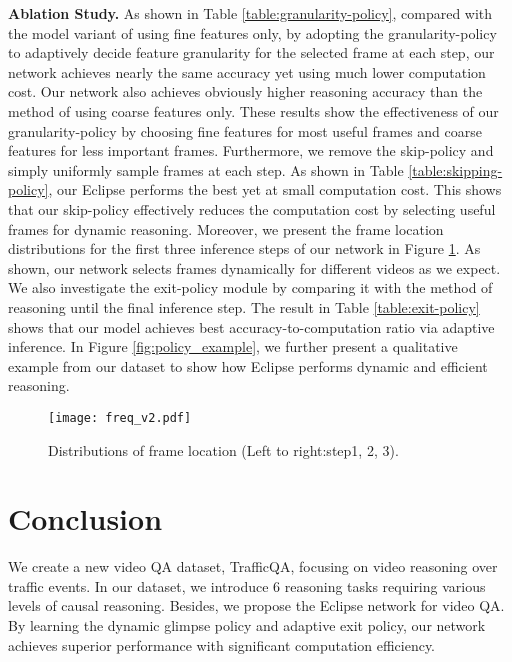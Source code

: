 \documentclass[final]{cvpr}
\begin{document}
{\bf Ablation Study.} As shown in Table \ref{table:granularity-policy}, compared with the model variant of using fine features only, by adopting the granularity-policy to adaptively decide feature granularity for the selected frame at each step, our network achieves nearly the same accuracy yet using much lower computation cost. 
Our network also achieves obviously higher reasoning accuracy than the method of using coarse features only. These results show the effectiveness of our granularity-policy by choosing fine features for most useful frames and coarse features for less important frames. 
Furthermore, we remove the skip-policy and simply uniformly sample frames at each step. 
As shown in Table \ref{table:skipping-policy}, our Eclipse performs the best yet at small computation cost. 
This shows that our skip-policy effectively reduces the computation cost by selecting useful frames for dynamic reasoning.
Moreover, we present the frame location distributions for the first three inference steps of our network in Figure \ref{fig:Freq}. 
As shown, our network selects frames dynamically for different videos as we expect. 
We also investigate the exit-policy module by comparing it with the method of reasoning until the final inference step. The result in Table \ref{table:exit-policy} shows that our model achieves best accuracy-to-computation ratio via adaptive inference. In Figure \ref{fig:policy_example}, we further present a qualitative example from our dataset to show how Eclipse performs dynamic and efficient reasoning. 


\begin{figure}[htbp]
\vspace{-0.3cm}
\begin{center}
   \texttt{[image: freq\_v2.pdf]}
\end{center}
\vspace{-0.4cm}
   \caption{Distributions of frame location (Left to right:step1, 2, 3).}
\label{fig:Freq}
\vspace{-0.4cm}
\end{figure}



\section{Conclusion}
We create a new video QA dataset, TrafficQA, focusing on video reasoning over traffic events. In our dataset, we introduce 6 reasoning tasks requiring various levels of causal reasoning. Besides, we propose the Eclipse network for video QA. By learning the dynamic glimpse policy and adaptive exit policy, our network achieves superior performance with significant computation efficiency.
\end{document}

